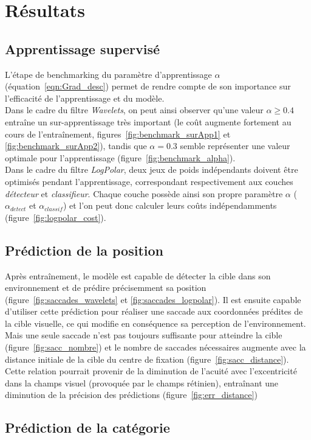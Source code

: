 
\chapter{Résultats} %
 
\label{Résultats} %


\section{Apprentissage supervisé}

L'étape de benchmarking du paramètre d'apprentissage $\alpha$ (équation~\ref{eqn:Grad_desc}) permet de rendre compte de son importance sur l'efficacité de l'apprentissage et du modèle. \\
Dans le cadre du filtre \textit{Wavelets}, on peut ainsi observer qu'une valeur $\alpha\geq0.4$ entraîne un sur-apprentissage très important (le coût augmente fortement au cours de l'entraînement, figures~\ref{fig:benchmark_surApp1} et \ref{fig:benchmark_surApp2}), tandis que $\alpha=0.3$ semble représenter une valeur optimale pour l'apprentissage (figure~\ref{fig:benchmark_alpha}).\\
Dans le cadre du filtre \textit{LogPolar}, deux jeux de poids indépendants doivent être optimisés pendant l'apprentissage,  correspondant respectivement aux couches \textit{détecteur} et \textit{classifieur}. Chaque couche possède ainsi son propre paramètre $\alpha$ ($\alpha_{detect}$ et $\alpha_{classif}$) et l'on peut donc calculer leurs coûts indépendamments (figure~\ref{fig:logpolar_cost}).


\section{Prédiction de la position}

Après entraînement, le modèle est capable de détecter la cible dans son environnement et de prédire précisemment sa position (figure~\ref{fig:saccades_wavelets} et \ref{fig:saccades_logpolar}). Il est ensuite capable d'utiliser cette prédiction pour réaliser une saccade aux coordonnées prédites de la cible visuelle, ce qui modifie en conséquence sa perception de l'environnement.\\
Mais une seule saccade n'est pas toujours suffisante pour atteindre la cible (figure~\ref{fig:sacc_nombre}) et le nombre de saccades nécessaires augmente avec la distance initiale de la cible du centre de fixation (figure~\ref{fig:sacc_distance}). Cette relation pourrait provenir de la diminution de l'acuité avec l'excentricité dans la champs visuel (provoquée par le champs rétinien), entraînant une diminution de la précision des prédictions (figure~\ref{fig:err_distance})


\section{Prédiction de la catégorie}

